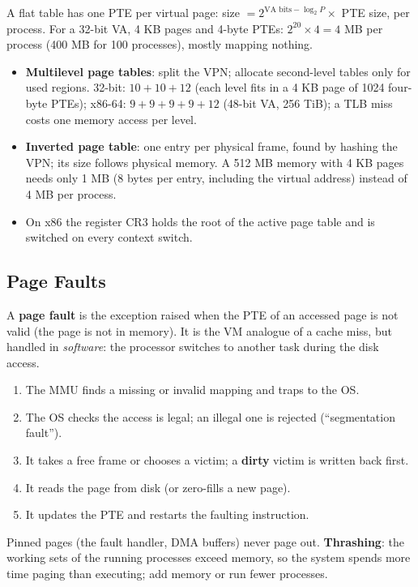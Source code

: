 \begin{prop}
A flat table has one PTE per virtual page:
size $=2^{\text{VA bits}-\log_2P}\times$ PTE size, per process. For a 32-bit VA,
4 KB pages and 4-byte PTEs: $2^{20}\times4=4$ MB per process (400 MB for 100
processes), mostly mapping nothing.
\end{prop}
\begin{itemize}
  \item \textbf{Multilevel page tables}: split the VPN; allocate second-level
  tables only for used regions. 32-bit: $10+10+12$ (each level fits in a 4 KB page
  of 1024 four-byte PTEs); x86-64: $9+9+9+9+12$ (48-bit VA, 256 TiB); a TLB miss
  costs one memory access per level.
  \item \textbf{Inverted page table}: one entry per physical frame, found by hashing
  the VPN; its size follows physical memory. A 512 MB memory with 4 KB pages needs
  only 1 MB (8 bytes per entry, including the virtual address) instead of 4 MB per
  process.
  \item On x86 the register CR3 holds the root of the active page table and is
  switched on every context switch.
\end{itemize}

\subsection{Page Faults}
\label{sec:vm-faults}

\begin{definition}
A \textbf{page fault} is the exception raised when the PTE of an accessed page is
not valid (the page is not in memory). It is the VM analogue of a cache miss, but
handled in \emph{software}: the processor switches to another task during the
disk access.
\end{definition}
\begin{enumerate}
  \item The MMU finds a missing or invalid mapping and traps to the OS.
  \item The OS checks the access is legal; an illegal one is rejected (``segmentation
  fault'').
  \item It takes a free frame or chooses a victim; a \textbf{dirty} victim is written
  back first.
  \item It reads the page from disk (or zero-fills a new page).
  \item It updates the PTE and restarts the faulting instruction.
\end{enumerate}
Pinned pages (the fault handler, DMA buffers) never page out. \textbf{Thrashing}:
the working sets of the running processes exceed memory, so the system spends
more time paging than executing; add memory or run fewer processes.

